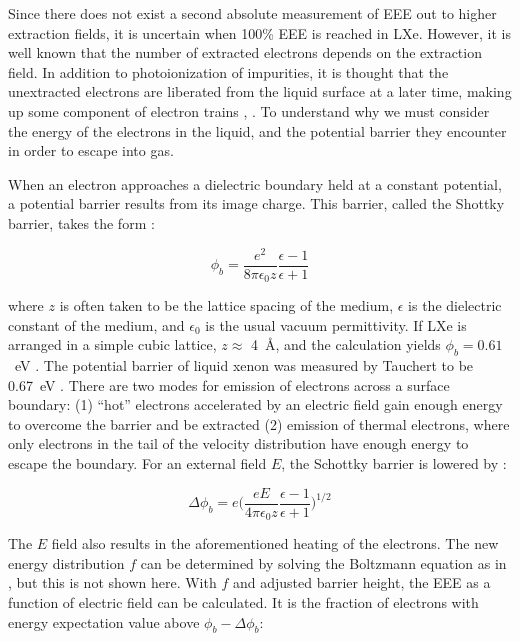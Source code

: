 Since there does not exist a second absolute measurement of \ac{EEE} out to higher extraction fields, it is uncertain when 100\% \ac{EEE} is reached in \ac{LXe}. However, it is well known that the number of extracted electrons depends on the extraction field. In addition to photoionization of impurities, it is thought that the unextracted electrons are liberated from the liquid surface at a later time, making up some component of electron trains \cite{Aprile2014}, \cite{Edwards2018}. To understand why we must consider the energy of the electrons in the liquid, and the potential barrier they encounter in order to escape into gas.

When an electron approaches a dielectric boundary held at a constant potential, a potential barrier results from its image charge. This barrier, called the Shottky barrier, takes the form \cite{Sorensen2017}:

\begin{equation}
\phi_{b} = \frac{e^{2}}{8\pi \epsilon_{0} z} \frac{\epsilon - 1}{\epsilon + 1}
\end{equation}

where $z$ is often taken to be the lattice spacing of the medium, $\epsilon$ is the dielectric constant of the medium, and $\epsilon_{0}$ is the usual vacuum permittivity. If \ac{LXe} is arranged in a simple cubic lattice, $z \approx$ 4~\AA, and the calculation yields $\phi_{b} = 0.61$~eV \cite{Sorensen2017}. The potential barrier of liquid xenon was measured by Tauchert to be 0.67~eV \cite{Tauchert1975}. There are two modes for emission of electrons across a surface boundary: (1) ``hot'' electrons accelerated by an electric field gain enough energy to overcome the barrier and be extracted (2) emission of thermal electrons, where only electrons in the tail of the velocity distribution have enough energy to escape the boundary. For an external field $E$, the Schottky barrier is lowered by \cite{Sorensen2017}:

\begin{equation}
\Delta \phi_{b} = e \Big ( \frac{eE}{4\pi \epsilon_{0} z} \frac{\epsilon - 1}{\epsilon + 1} \Big ) ^{1/2}
\end{equation}

The $E$ field also results in the aforementioned heating of the electrons. The new energy distribution $f$ can be determined by solving the Boltzmann equation as in \cite{Cohen1967}, but this is not shown here. With $f$ and adjusted barrier height, the \ac{EEE} as a function of electric field can be calculated. It is the fraction of electrons with energy expectation value above $\phi_{b} - \Delta\phi_{b}$:

